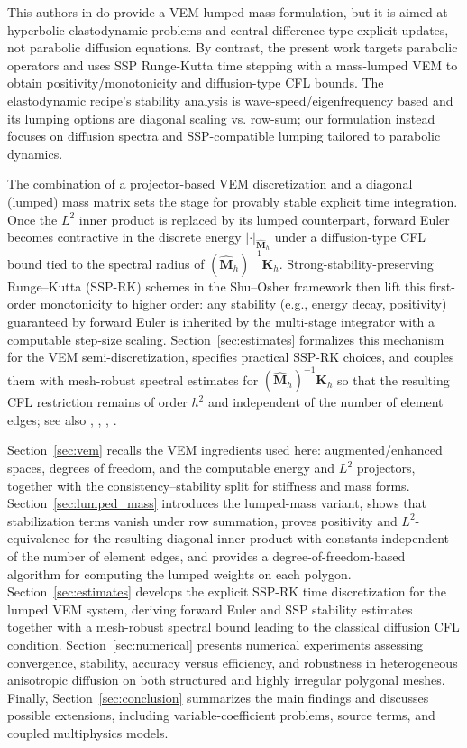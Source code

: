\documentclass{article}
\newcommand{\K}{\mathbf{K}_h}
\newcommand{\M}{\hat{\mathbf{M}}_h}
\begin{document}
This authors in \cite{park2020elastodynamic} do provide a VEM lumped-mass formulation, but it is aimed at hyperbolic elastodynamic problems and central-difference-type explicit updates, not parabolic diffusion equations. By contrast, the present work targets parabolic operators and uses SSP Runge-Kutta time stepping with a mass-lumped VEM to obtain positivity/monotonicity and diffusion-type CFL bounds. The elastodynamic recipe’s stability analysis is wave-speed/eigenfrequency based and its lumping options are diagonal scaling vs. row-sum; our formulation instead focuses on diffusion spectra and SSP-compatible lumping tailored to parabolic dynamics.  

The combination of a projector-based VEM discretization and a diagonal (lumped) mass matrix sets the stage for provably stable explicit time integration. Once the $L^2$ inner product is replaced by its lumped counterpart, forward Euler becomes contractive in the discrete energy $|\cdot|_{\M}$ under a diffusion-type CFL bound tied to the spectral radius of $(\M)^{-1}\K$. Strong-stability-preserving Runge--Kutta (SSP-RK) schemes in the Shu--Osher framework then lift this first-order monotonicity to higher order: any stability (e.g., energy decay, positivity) guaranteed by forward Euler is inherited by the multi-stage integrator with a computable step-size scaling. Section~\ref{sec:estimates} formalizes this mechanism for the VEM semi-discretization, specifies practical SSP-RK choices, and couples them with mesh-robust spectral estimates for $(\M)^{-1}\K$ so that the resulting CFL restriction remains of order $h^2$ and independent of the number of element edges; see also \cite{shu1988eno}, \cite{gottlieb1998ssp}, \cite{califano2018ssp}, \cite{izzo2022ssp}.

Section~\ref{sec:vem} recalls the VEM ingredients used here: augmented/enhanced spaces, degrees of freedom, and the computable energy and $L^2$ projectors, together with the consistency--stability split for stiffness and mass forms. Section~\ref{sec:lumped_mass} introduces the lumped-mass variant, shows that stabilization terms vanish under row summation, proves positivity and $L^2$-equivalence for the resulting diagonal inner product with constants independent of the number of element edges, and provides a degree-of-freedom-based algorithm for computing the lumped weights on each polygon. Section~\ref{sec:estimates} develops the explicit SSP-RK time discretization for the lumped VEM system, deriving forward Euler and SSP stability estimates together with a mesh-robust spectral bound leading to the classical diffusion CFL condition. Section~\ref{sec:numerical} presents numerical experiments assessing convergence, stability, accuracy versus efficiency, and robustness in heterogeneous anisotropic diffusion on both structured and highly irregular polygonal meshes. Finally, Section~\ref{sec:conclusion} summarizes the main findings and discusses possible extensions, including variable-coefficient problems, source terms, and coupled multiphysics models.
\end{document}
